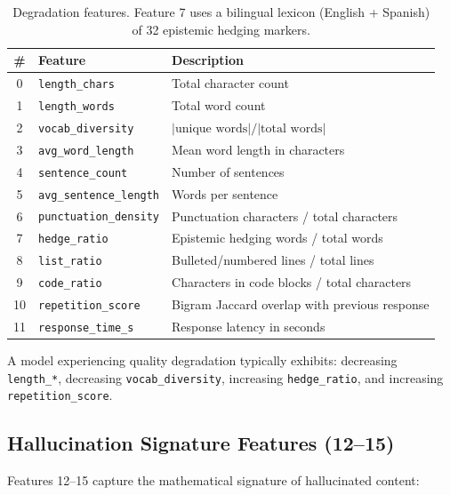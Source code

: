 \documentclass[11pt,a4paper]{article}
\begin{document}
\begin{table}[h]
\centering
\small
\begin{tabular}{cll}
\toprule
\textbf{\#} & \textbf{Feature} & \textbf{Description} \\
\midrule
0 & \texttt{length\_chars} & Total character count \\
1 & \texttt{length\_words} & Total word count \\
2 & \texttt{vocab\_diversity} & $|\text{unique words}| / |\text{total words}|$ \\
3 & \texttt{avg\_word\_length} & Mean word length in characters \\
4 & \texttt{sentence\_count} & Number of sentences \\
5 & \texttt{avg\_sentence\_length} & Words per sentence \\
6 & \texttt{punctuation\_density} & Punctuation characters / total characters \\
7 & \texttt{hedge\_ratio} & Epistemic hedging words / total words \\
8 & \texttt{list\_ratio} & Bulleted/numbered lines / total lines \\
9 & \texttt{code\_ratio} & Characters in code blocks / total characters \\
10 & \texttt{repetition\_score} & Bigram Jaccard overlap with previous response \\
11 & \texttt{response\_time\_s} & Response latency in seconds \\
\bottomrule
\end{tabular}
\caption{Degradation features. Feature 7 uses a bilingual lexicon (English + Spanish) of 32 epistemic hedging markers.}
\end{table}

A model experiencing quality degradation typically exhibits: decreasing \texttt{length\_*}, decreasing \texttt{vocab\_diversity}, increasing \texttt{hedge\_ratio}, and increasing \texttt{repetition\_score}.

\subsection{Hallucination Signature Features (12--15)}

Features 12--15 capture the mathematical signature of hallucinated content:
\end{document}
